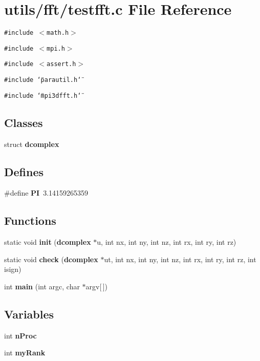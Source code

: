 \section{utils/fft/testfft.c File Reference}
\label{testfft_8c}
{\tt \#include $<$math.h$>$}\par
{\tt \#include $<$mpi.h$>$}\par
{\tt \#include $<$assert.h$>$}\par
{\tt \#include \char`\"{}parautil.h\char`\"{}}\par
{\tt \#include \char`\"{}mpi3dfft.h\char`\"{}}\par
\subsection*{Classes}
\begin{CompactItemize}
\item 
struct {\bf dcomplex}
\end{CompactItemize}
\subsection*{Defines}
\begin{CompactItemize}
\item 
\#define {\bf PI}~3.14159265359
\end{CompactItemize}
\subsection*{Functions}
\begin{CompactItemize}
\item 
static void {\bf init} ({\bf dcomplex} $\ast$u, int nx, int ny, int nz, int rx, int ry, int rz)
\item 
static void {\bf check} ({\bf dcomplex} $\ast$ut, int nx, int ny, int nz, int rx, int ry, int rz, int isign)
\item 
int {\bf main} (int argc, char $\ast$argv[$\,$])
\end{CompactItemize}
\subsection*{Variables}
\begin{CompactItemize}
\item 
int {\bf n\-Proc}
\item 
int {\bf my\-Rank}
\end{CompactItemize}


